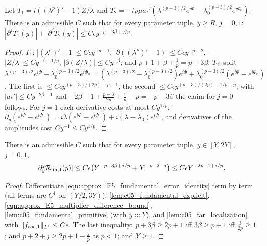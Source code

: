 \begin{lemma}
  \label{lem:c05_fundamental_explicit}
  Let $T_1=i((\lambda^p)'-1)Z/\lambda$ and $T_2=-ip\mu a_*'(\lambda^{(p-3)/2}e^{i\Phi}-\lambda_0^{(p-3)/2}e^{i\Phi_0})$. There is an admissible
  $C$ such that for every parameter tuple, $y\ge R$, $j=0,1$: $|\partial^jT_1(y)|+|\partial^jT_2(y)|\le C\epsilon y^{-p-3\beta+j/p}$.
\end{lemma}
\begin{proof}
  $T_1$: $|(\lambda^p)'-1|\le C\epsilon y^{-p-1}$, $|\partial((\lambda^p)'-1)|\le C\epsilon y^{-p-2}$, $|Z/\lambda|\le Cy^{-\beta-1/p}$,
  $|\partial(Z/\lambda)|\le Cy^{-\beta}$; and $p+1+\beta+\frac1p=p+3\beta$.
  $T_2$: split $\lambda^{(p-3)/2}e^{i\Phi}-\lambda_0^{(p-3)/2}e^{i\Phi_0}=(\lambda^{(p-3)/2}-\lambda_0^{(p-3)/2})e^{i\Phi}+\lambda_0^{(p-3)/2}(e^{i\Phi}-e^{i\Phi_0})$.
  The first is $\le C\epsilon y^{(p-3)/(2p)-p-1}$, the second $\le C\epsilon y^{(p-3)/(2p)+1/p-p}$; with $|a_*'|\le Cy^{-2\beta-1}$ and
  $-2\beta-1+\frac{p-3}{2p}+\frac1p-p=-p-3\beta$ the claim for $j=0$ follows. For $j=1$ each derivative costs at most $Cy^{1/p}$:
  $\partial_y(e^{i\Phi}-e^{i\Phi_0})=i\lambda(e^{i\Phi}-e^{i\Phi_0})+i(\lambda-\lambda_0)e^{i\Phi_0}$, and derivatives of the
  amplitudes cost $Cy^{-1}\le Cy^{1/p}$.
\end{proof}

\begin{lemma}
  \label{lem:c05_fundamental_bound}
  There is an admissible $C$ such that for every parameter tuple, $y\in[Y,2Y]$, $j=0,1$,
  \begin{equation}\label{eqn:approx_E5_fundamental_bound}
    |\partial_y^j\mathcal{R}_{\textup{lin},1}(y)|\le C\epsilon\bigl(Y^{-p-3\beta+j/p}+Y^{-p-2-j}\bigr)\le C\epsilon Y^{-2p-1+j/p}.
  \end{equation}
\end{lemma}
\begin{proof}
  Differentiate \eqref{eqn:approx_E5_fundamental_error_identity} term by term (all terms are $C^1$ on $(Y/2,3Y)$): \cref{lem:c05_fundamental_explicit},
  \eqref{eqn:approx_E5_multiplier_difference_bound}, \cref{lem:c05_fundamental_primitive} (with $y\approx Y$), and
  \cref{lem:c05_far_localization} with $\|f_{\textup{osc},1}\|_{L^1}\le C\epsilon$. The last inequality: $p+3\beta\ge2p+1$ iff
  $3\beta\ge p+1$ iff $\frac3{2p}\ge1$; and $p+2+j\ge2p+1-\frac jp$ as $p<1$; and $Y\ge1$.
\end{proof}

